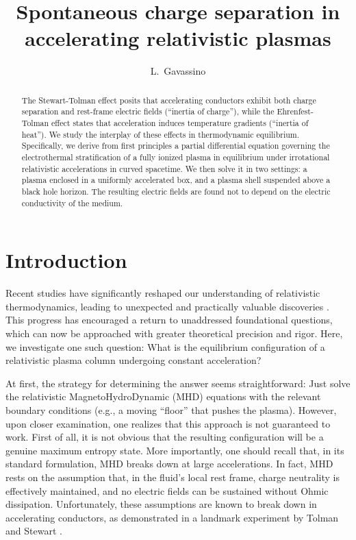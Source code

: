\documentclass[a4paper, amsfonts, amssymb, amsmath, reprint, showkeys, nofootinbib, twoside, onecolumn,notitlepage]{revtex4-1}
\theoremstyle{definition}
\theoremstyle{theorem}
\begin{document}
\title{Spontaneous charge separation in accelerating relativistic plasmas}
\author{L.~Gavassino}

\begin{abstract}
The Stewart-Tolman effect posits that accelerating conductors exhibit both charge separation and rest-frame electric fields (``inertia of charge''), while the Ehrenfest-Tolman effect
states that acceleration induces temperature gradients  (``inertia of heat''). We study the interplay of these effects in thermodynamic equilibrium. Specifically, we derive from first principles a partial differential equation governing the electrothermal stratification of a fully ionized plasma in equilibrium under irrotational relativistic accelerations in curved spacetime. We then solve it in two settings: a plasma enclosed in a uniformly accelerated box, and a plasma shell suspended above a black hole horizon. The resulting electric fields are found not to depend on the electric conductivity of the medium.
\end{abstract} 

\maketitle
\section{Introduction}
\vspace{-0.3cm}

Recent studies have significantly reshaped our understanding of relativistic thermodynamics, leading to unexpected and practically valuable discoveries \cite{Banerjee:2012iz,BecattiniQuantumCorrections2015,BecattiniBeta2016,Becattini:2019poj,Becattini:2020qol,Palermo:2021hlf,GavassinoTermometri,GavassinoGibbs2021,GavassinoCausality2021,GavassinoSymmetric2022nff,MullinsInfo2023tjg,GavassinoUniveraalityI2023odx,Mullins:2025vqa,Pei2025}. This progress has encouraged a return to unaddressed foundational questions, which can now be approached with greater theoretical precision and rigor. Here, we investigate one such question: What is the equilibrium configuration of a relativistic plasma column undergoing constant acceleration?

At first, the strategy for determining the answer seems straightforward: Just solve the relativistic MagnetoHydroDynamic (MHD) equations \cite{Mizuno:2024tis} with the relevant boundary conditions (e.g., a moving ``floor'' that pushes the plasma). However, upon closer examination, one realizes that this approach is not guaranteed to work. First of all, it is not obvious that the resulting configuration will be a genuine maximum entropy state. More importantly, one should recall that, in its standard formulation, MHD breaks down at large accelerations. In fact, MHD rests on the assumption that, in the fluid's local rest frame, charge neutrality is effectively maintained, and no electric fields can be sustained without Ohmic dissipation. Unfortunately, these assumptions are known to break down in accelerating conductors, as demonstrated in a landmark experiment by Tolman and Stewart \cite{TolmanStewart1916,WangStewartTolman2023,BeiPhD}.
\end{document}

